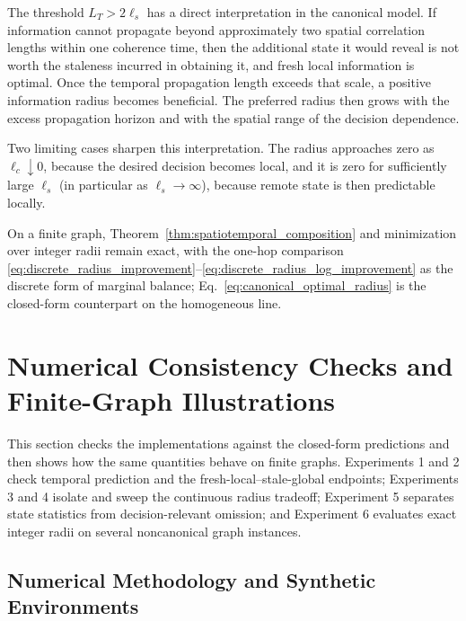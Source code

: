 \documentclass[11pt]{article}
\begin{document}
The threshold $L_T>2\ell_s$ has a direct interpretation in the canonical
model. If information cannot propagate beyond approximately two spatial
correlation lengths within one coherence time, then the additional state it
would reveal is not worth the staleness incurred in obtaining it, and fresh
local information is optimal. Once the temporal propagation length exceeds that scale,
a positive information radius becomes beneficial. The preferred radius then
grows with the excess propagation horizon and with the spatial range of the
decision dependence.

Two limiting cases sharpen this interpretation. The radius approaches zero as
$\ell_c\downarrow0$, because the desired decision becomes local, and it is zero
for sufficiently large $\ell_s$ (in particular as $\ell_s\to\infty$), because
remote state is then predictable locally.

On a finite graph, Theorem~\ref{thm:spatiotemporal_composition} and minimization
over integer radii remain exact, with the one-hop comparison
\eqref{eq:discrete_radius_improvement}--\eqref{eq:discrete_radius_log_improvement}
as the discrete form of marginal balance; Eq.~\eqref{eq:canonical_optimal_radius}
is the closed-form counterpart on the homogeneous line.





\section{Numerical Consistency Checks and Finite-Graph Illustrations}
\label{sec:numerical-evaluation}

This section checks the implementations against the closed-form predictions
and then shows how the same quantities behave on finite graphs.  Experiments 1 and 2
check temporal prediction and the fresh-local--stale-global endpoints;
Experiments 3 and 4 isolate and sweep the continuous radius tradeoff;
Experiment 5 separates state statistics from decision-relevant omission; and
Experiment 6 evaluates exact integer radii on several noncanonical graph
instances.

\subsection{Numerical Methodology and Synthetic Environments}
\label{subsec:numerical-methodology}
\end{document}
